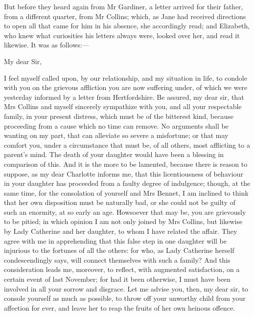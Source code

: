 But before they heard again from Mr Gardiner, a letter arrived for their father, from a different quarter, from Mr Collins; which, as Jane had received directions to open all that came for him in his absence, she accordingly read; and Elizabeth, who knew what curiosities his letters always were, looked over her, and read it likewise. It was as follows:—

\begin{mail}{}{My dear Sir,}

I feel myself called upon, by our relationship, and my situation in life, to condole with you on the grievous affliction you are now suffering under, of which we were yesterday informed by a letter from Hertfordshire. Be assured, my dear sir, that Mrs Collins and myself sincerely sympathize with you, and all your respectable family, in your present distress, which must be of the bitterest kind, because proceeding from a cause which no time can remove. No arguments shall be wanting on my part, that can alleviate so severe a misfortune; or that may comfort you, under a circumstance that must be, of all others, most afflicting to a parent's mind. The death of your daughter would have been a blessing in comparison of this. And it is the more to be lamented, because there is reason to suppose, as my dear Charlotte informs me, that this licentiousness of behaviour in your daughter has proceeded from a faulty degree of indulgence; though, at the same time, for the consolation of yourself and Mrs Bennet, I am inclined to think that her own disposition must be naturally bad, or she could not be guilty of such an enormity, at so early an age. Howsoever that may be, you are grievously to be pitied; in which opinion I am not only joined by Mrs Collins, but likewise by Lady Catherine and her daughter, to whom I have related the affair. They agree with me in apprehending that this false step in one daughter will be injurious to the fortunes of all the others: for who, as Lady Catherine herself condescendingly says, will connect themselves with such a family? And this consideration leads me, moreover, to reflect, with augmented satisfaction, on a certain event of last November; for had it been otherwise, I must have been involved in all your sorrow and disgrace. Let me advise you, then, my dear sir, to console yourself as much as possible, to throw off your unworthy child from your affection for ever, and leave her to reap the fruits of her own heinous offence.

\end{mail}

